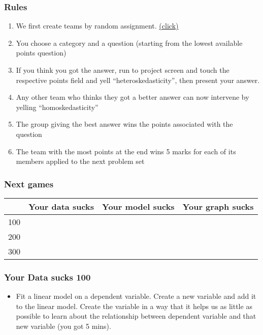 \documentclass[xcolor=table,dvipsnames]{beamer}
\begin{document}
\begin{frame}
\frametitle{Rules}
\begin{enumerate}
\item We first create teams by random assignment. \href{https://www.randomlists.com/team-generator}{(click)}
\item You choose a category and a question (starting from the lowest available points question)
\item If you think you got the answer, run to project screen and touch the respective points field and yell ``heteroskedasticity'', then present your answer.
\item Any other team who thinks they got a better answer can now intervene by yelling ``homoskedasticity''
\item The group giving the best answer wins the points associated with the question
\item The team with the most points at the end wins 5 marks for each of its members applied to the next problem set
\end{enumerate}
\end{frame}


\begin{frame}
\frametitle{Next games}
\begin{table}[H]\centering
{\color{white} \begin{tabular}{|r|c|c|c|} \hline
\rowcolor{jeopardy} & Your data sucks & Your model sucks & Your graph sucks \\\hline
\rowcolor{jeopardy} 100 & & & \\\hline
\rowcolor{jeopardy} 200 & & & \\\hline
\rowcolor{jeopardy} 300 & &	& \\\hline
\end{tabular}}
\end{table}

\end{frame}	


\begin{frame}
\frametitle{Your Data sucks 100}
\begin{itemize}	
\item[] Fit a linear model on a dependent variable. Create a new variable and add it to the linear model. Create the variable in a way that it helps us as little as possible to learn about the relationship between dependent variable and that new variable (you got 5 mins).
\end{itemize}
\end{frame}	
\end{document}
